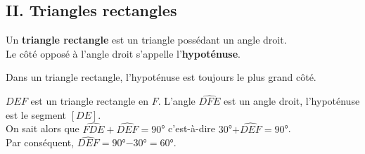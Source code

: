 \newpage
\subsection*{II. Triangles rectangles}

 
\begin{Définition}[c]
Un \textbf{triangle rectangle} est un triangle possédant un angle droit.\\
Le côté opposé à l'angle droit s'appelle l'\textbf{hypoténuse}.
\end{Définition}
 


\begin{Propriété}[c]
Dans un triangle rectangle, l'hypoténuse est toujours le plus grand côté.
\end{Propriété}

 

\begin{Exemple}
\begin{minipage}[c]{0.6\textwidth}
$DEF$ est un triangle rectangle en $F$. L'angle $\widehat{DFE}$ est un angle droit, l'hypoténuse est le segment $[DE]$. \\
On sait alors que $\widehat{FDE} + \widehat{DEF} = 90$° c'est-à-dire $30$°$ + \widehat{DEF} = 90$°. \\
Par conséquent, $\widehat{DEF} = 90$°$ - 30$°$ = 60$°.
\end{minipage}\hfill  \begin{minipage}[c]{0.35\textwidth}
\begin{center}
\end{center}
\end{minipage}

\end{Exemple}
 
